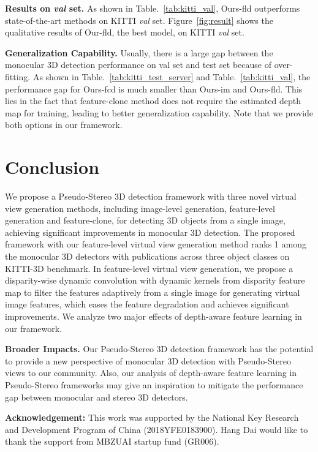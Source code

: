 \documentclass[10pt,twocolumn,letterpaper]{article}
\begin{document}
\noindent\textbf{Results on \emph{val} set.} As shown in Table.~\ref{tab:kitti_val}, Ours-fld outperforms state-of-the-art methods on KITTI \emph{val} set. Figure~\ref{fig:result} shows the qualitative results of Our-fld, the best model, on KITTI \emph{val} set.

\noindent\textbf{Generalization Capability.} Usually, there is a large gap between the monocular 3D detection performance on val set and test set because of over-fitting. As shown in Table.~\ref{tab:kitti_test_server} and Table.~\ref{tab:kitti_val}, the performance gap for Ours-fcd is much smaller than Ours-im and Ours-fld. This lies in the fact that feature-clone method does not require the estimated depth map for training, leading to better generalization capability. Note that we provide both options in our framework.







\section{Conclusion}
We propose a Pseudo-Stereo 3D detection framework with three novel virtual view generation methods, including image-level generation, feature-level generation and feature-clone, for detecting 3D objects from a single image, achieving significant improvements in monocular 3D detection. The proposed framework with our feature-level virtual view generation method ranks 1 among the monocular 3D detectors with publications across three object classes on KITTI-3D benchmark. In feature-level virtual view generation, we propose a disparity-wise dynamic convolution with dynamic kernels from disparity feature map to filter the features adaptively from a single image for generating virtual image features, which eases the feature degradation and achieves significant improvements.
We analyze two major effects of depth-aware feature learning in our framework. 

\noindent\textbf{Broader Impacts.} Our Pseudo-Stereo 3D detection framework has the potential to provide a new perspective of monocular 3D detection with Pseudo-Stereo views to our community. Also, our analysis of depth-aware feature learning in Pseudo-Stereo frameworks may give an inspiration to mitigate the performance gap between monocular and stereo 3D detectors.   

\textbf{Acknowledgement:} This work was supported by
the National Key Research and Development Program of
China (2018YFE0183900). Hang Dai would like to thank
the support from MBZUAI startup fund (GR006).

{\small


}
\end{document}
